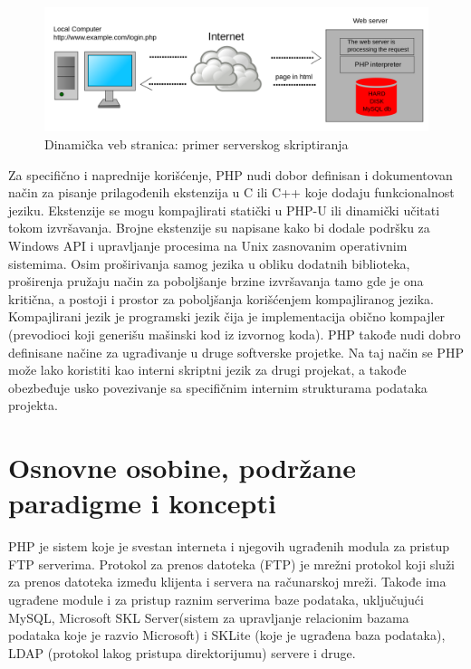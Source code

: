 \documentclass[a4paper]{article}
\begin{document}
{\begin{figure}[h!]
\begin{center}
\includegraphics[scale=0.15]{primer_serverskog_skriptiranja.png}
\end{center}
\caption{Dinamička veb stranica: primer serverskog skriptiranja}
\label{fig:server}
\end{figure}
Za specifično i naprednije korišćenje, PHP nudi dobor definisan i dokumentovan način za pisanje prilagođenih ekstenzija u C ili C++ koje dodaju
funkcionalnost jeziku. Ekstenzije se mogu kompajlirati statički u PHP-U ili dinamički učitati tokom izvršavanja. Brojne ekstenzije su napisane kako bi dodale podršku za Windows API i upravljanje procesima na Unix zasnovanim operativnim sistemima. Osim proširivanja samog jezika u obliku dodatnih biblioteka, proširenja pružaju način za poboljšanje brzine izvršavanja tamo gde je ona kritična, a postoji i prostor za poboljšanja korišćenjem kompajliranog jezika. Kompajlirani jezik je programski jezik čija je implementacija obično kompajler (prevodioci koji generišu mašinski kod iz izvornog koda). PHP takođe nudi dobro definisane načine za ugrađivanje u druge softverske projetke. Na taj način se PHP može lako koristiti kao interni skriptni jezik za drugi projekat, a takođe obezbeđuje usko povezivanje sa specifičnim internim strukturama podataka projekta.


\section{Osnovne osobine, podržane paradigme i koncepti}
PHP je sistem koje je svestan interneta i njegovih ugrađenih modula za pristup FTP serverima. Protokol za prenos datoteka (FTP) je mrežni protokol koji služi za prenos datoteka između klijenta i servera na računarskoj mreži. Takođe ima ugrađene module i za pristup raznim serverima baze podataka, uključujući MySQL, Microsoft SKL Server(sistem za upravljanje relacionim bazama podataka koje je razvio Microsoft) i SKLite (koje je ugrađena baza podataka), LDAP (protokol lakog pristupa direktorijumu) servere i druge. 

}
\end{document}
